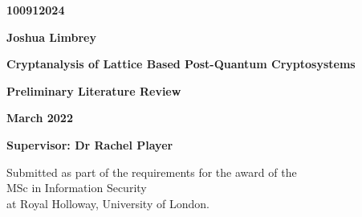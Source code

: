 \documentclass[a4paper, 10pt]{article}
\begin{document}
\begin{titlepage}
    \begin{center}
        \Large
        \textbf{100912024}

        \vspace{0.1cm}
        \textbf{Joshua Limbrey}

        \vspace{5cm}
        \LARGE
        \textbf{Cryptanalysis of Lattice Based Post-Quantum Cryptosystems}

        \vspace{0.1cm}
        \large
        \textbf{Preliminary Literature Review}

        \vspace{0.1cm}
        \textbf{March 2022}

        \vspace{1.5cm}
        \textbf{Supervisor: Dr Rachel Player}

        \vfill

        Submitted as part of the requirements for the award of the\\MSc in Information Security\\at Royal Holloway, University of London.


        \vspace{2.5cm}

    \end{center}
\end{titlepage}

\section{}

    
\end{document}
